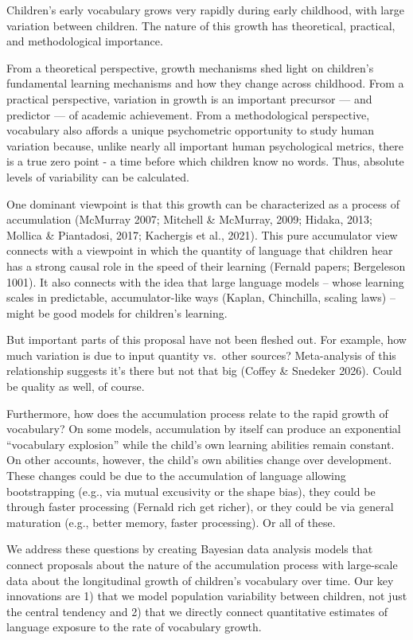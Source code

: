 \documentclass[
]{pnas-new}
\begin{document}
Children's early vocabulary grows very rapidly during early childhood,
with large variation between children. The nature of this growth has
theoretical, practical, and methodological importance.

From a theoretical perspective, growth mechanisms shed light on
children's fundamental learning mechanisms and how they change across
childhood. From a practical perspective, variation in growth is an
important precursor --- and predictor --- of academic achievement. From
a methodological perspective, vocabulary also affords a unique
psychometric opportunity to study human variation because, unlike nearly
all important human psychological metrics, there is a true zero point -
a time before which children know no words. Thus, absolute levels of
variability can be calculated.

One dominant viewpoint is that this growth can be characterized as a
process of accumulation (McMurray 2007; Mitchell \& McMurray, 2009;
Hidaka, 2013; Mollica \& Piantadosi, 2017; Kachergis et al., 2021). This
pure accumulator view connects with a viewpoint in which the quantity of
language that children hear has a strong causal role in the speed of
their learning (Fernald papers; Bergeleson 1001). It also connects with
the idea that large language models -- whose learning scales in
predictable, accumulator-like ways (Kaplan, Chinchilla, scaling laws) --
might be good models for children's learning.

But important parts of this proposal have not been fleshed out. For
example, how much variation is due to input quantity vs.~other sources?
Meta-analysis of this relationship suggests it's there but not that big
(Coffey \& Snedeker 2026). Could be quality as well, of course.

Furthermore, how does the accumulation process relate to the rapid
growth of vocabulary? On some models, accumulation by itself can produce
an exponential ``vocabulary explosion'' while the child's own learning
abilities remain constant. On other accounts, however, the child's own
abilities change over development. These changes could be due to the
accumulation of language allowing bootstrapping (e.g., via mutual
excusivity or the shape bias), they could be through faster processing
(Fernald rich get richer), or they could be via general maturation
(e.g., better memory, faster processing). Or all of these.

We address these questions by creating Bayesian data analysis models
that connect proposals about the nature of the accumulation process with
large-scale data about the longitudinal growth of children's vocabulary
over time. Our key innovations are 1) that we model population
variability between children, not just the central tendency and 2) that
we directly connect quantitative estimates of language exposure to the
rate of vocabulary growth.
\end{document}
